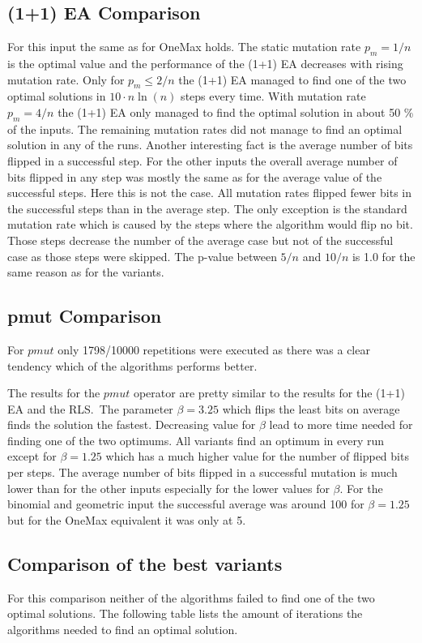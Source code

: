 \subsection{(1+1) EA Comparison}

For this input the same as for OneMax holds. 
The static mutation rate $p_m=1/n$ is the optimal value and the performance of the (1+1) EA decreases with rising mutation rate.
Only for $p_m\le2/n$ the (1+1) EA managed to find one of the two optimal solutions in $10 \cdot n\ln(n)$ steps every time.
With mutation rate $p_m=4/n$ the (1+1) EA only managed to find the optimal solution in about 50 \% of the inputs.
The remaining mutation rates did not manage to find an optimal solution in any of the runs.
Another interesting fact is the average number of bits flipped in a successful step.
For the other inputs the overall average number of bits flipped in any step was mostly the same as for the average value of the successful steps. Here this is not the case.
All mutation rates flipped fewer bits in the successful steps than in the average step.
The only exception is the standard mutation rate which is caused by the steps where the algorithm would flip no bit.
Those steps decrease the number of the average case but not of the successful case as those steps were skipped.
The p-value between $5/n$ and $10/n$ is 1.0 for the same reason as for the \RLSN[b] variants.
\subsection{pmut Comparison}
For $pmut$ only 1798/10000 repetitions were executed as there was a clear tendency which of the algorithms performs better.


The results for the $pmut$ operator are pretty similar to the results for the (1+1) EA and the RLS.\
The parameter $\beta=3.25$ which flips the least bits on average finds the solution the fastest.
Decreasing value for $\beta$ lead to more time needed for finding one of the two optimums.
All variants find an optimum in every run except for $\beta=1.25$ which has a much higher value for the number of flipped bits per steps.
The average number of bits flipped in a successful mutation is much lower than for the other inputs especially for the lower values for $\beta$.
For the binomial and geometric input the successful average was around 100 for $\beta=1.25$ but for the OneMax equivalent it was only at 5.

\subsection{Comparison of the best variants}
For this comparison neither of the algorithms failed to find one of the two optimal solutions.
The following table lists the amount of iterations the algorithms needed to find an optimal solution.

